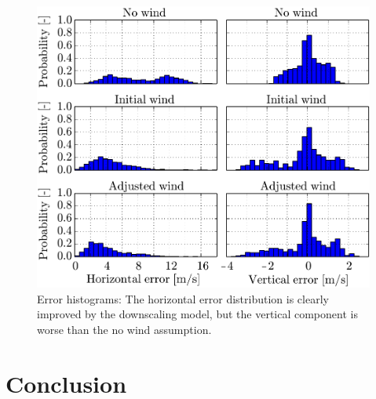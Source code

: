 \documentclass[twocolumn,letterpaper]{IEEEAerospaceCLS}
\begin{document}
\begin{figure}[htbp]
\centering
\includegraphics[width=\columnwidth]{images/WindPred/Results/hist_all.pdf}
\caption[Error histograms]{Error histograms: The horizontal error distribution is clearly improved by the downscaling model, but the vertical component is worse than the no wind assumption. }
\label{fig:PL_WindPred_hist_unweighted}
\end{figure}

\section{Conclusion}
\label{sec:PL_WindPred_Conclusion}
\end{document}
